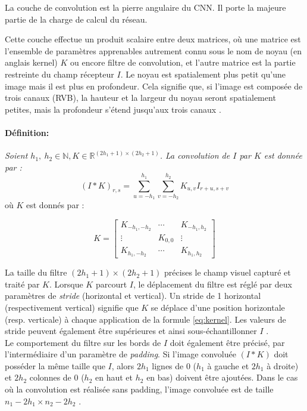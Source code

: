 	La couche de convolution est la pierre angulaire du CNN. Il porte la majeure partie de la charge de calcul du réseau.
	
	Cette couche effectue un produit scalaire entre deux matrices, où une matrice est l'ensemble de paramètres apprenables autrement connu sous le nom de noyau (en anglais kernel) $K$ ou encore filtre de convolution, et l'autre matrice est la partie restreinte du champ récepteur $I$. Le noyau est spatialement plus petit qu'une image mais il est plus en profondeur. Cela signifie que, si l'image est composée de trois canaux (RVB), la hauteur et la largeur du noyau seront spatialement petites, mais la profondeur s'étend jusqu'aux trois canaux \cite{goodfellow2016deep}.
	
	\paragraph*{Définition:}
	
	\textit{Soient $h_1, \ h_2 \in \mathbb{N}, {K} \in \mathbb{R}^{(2h_1+1)\times(2h_2+1)}$. 
	La convolution de $I$ par $K$ est donnée par :} 
	\begin{equation} \label{eq:kernel}
		(I\ast K)_{r,s} = \sum_{u=-h_1}^{h_1} \sum_{v=-h_2}^{h_2} K_{u,v}I_{r+u,s+v}
	\end{equation} 
	où $K$ est donnés par : 
	
	$$ 
	K = \begin{bmatrix}
		{K_{-h_1,-h_2}}&\cdots &{K_{-h_1,h_2}}\\
		\vdots &{K_{0,0}} &\vdots \\
		{K_{h_1,-h_2}}&\cdots &{K_{h_1,h_2}}
	\end{bmatrix}
	$$
	
	La taille du filtre $(2h_1+1)\times(2h_2+1)$ précises le champ visuel capturé et traité par $K$.
	Lorsque $K$ parcourt $I$, le déplacement du filtre est réglé par deux paramètres de \textit{stride} (horizontal et vertical). Un stride de 1 horizontal (respectivement vertical) signifie que $K$ se déplace d'une position horizontale (resp. verticale) à chaque application de la formule \ref{eq:kernel}. Les valeurs de stride peuvent également être supérieures et ainsi sous-échantillonner $I$ \cite{goodfellow2016deep, antoine2018apprentissage}.\\
	Le comportement du filtre sur les bords de $I$ doit également être précisé, par l'intermédiaire d'un paramètre de \textit{padding}. Si l'image convoluée $(I\ast K)$ doit posséder la même taille que $I$, alors $2h_{1}$ lignes de 0 ($h_1$ à gauche et $2h_{1}$ à droite) et $2h_{2}$ colonnes de $0$ ($h_2$ en haut et $h_2$ en bas) doivent être ajoutées. Dans le cas où la convolution est réalisée sans padding, l'image convoluée est de taille $n_{1} - 2h_{1} \times n_{2} - 2h_{2}$ \cite{antoine2018apprentissage}.
	
